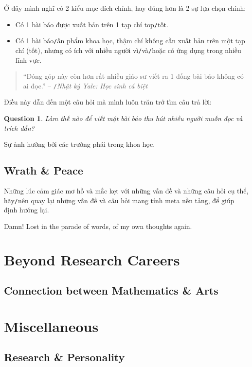 \documentclass{article}
\numberwithin{equation}{section}
\newtheorem{question}{Question}[section]
\begin{document}
Ở đây mình nghĩ có 2 kiểu mục đích chính, hay đúng hơn là 2 sự lựa chọn chính:
\begin{itemize}
	\item Có 1 bài báo được xuất bản trên 1 tạp chí top\texttt{/}tốt.
	\item Có 1 bài báo\texttt{/}ấn phẩm khoa học, thậm chí không cần xuất bản trên một tạp chí (tốt), nhưng có ích với nhiều người vì\texttt{/}và\texttt{/}hoặc có ứng dụng trong nhiều lĩnh vực.
\end{itemize}

\begin{quotation}
	``Đóng góp này còn hơn rất nhiều giáo sư viết ra 1 đống bài báo không có ai đọc.'' -- \cite{VHV's blog}\texttt{/}\textit{Nhật ký Yale: Học sinh cá biệt}
\end{quotation}
Điều này dẫn đến một câu hỏi mà mình luôn trăn trở tìm câu trả lời:
\begin{question}
	Làm thế nào để viết một bài báo thu hút nhiều người muốn đọc và trích dẫn?
\end{question}
Sự ảnh hưởng bởi các trường phái trong khoa học.

\subsection{Wrath \& Peace}
Những lúc cảm giác mơ hồ và mắc kẹt với những vấn đề và những câu hỏi cụ thể, hãy\texttt{/}nên quay lại những vấn đề và câu hỏi mang tính meta nền tảng, để giúp định hướng lại.

Damn! Lost in the parade of words, of my own thoughts again.

\section{Beyond Research Careers}

\subsection{Connection between Mathematics \& Arts}

\section{Miscellaneous}

\subsection{Research \& Personality}
\end{document}
